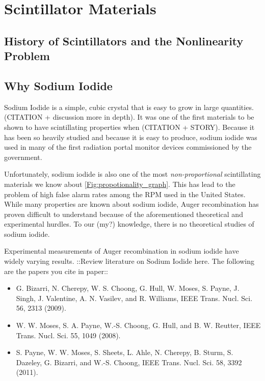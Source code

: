 \section{Scintillator Materials}\label{scintillator-materials}

\subsection{History of Scintillators and the Nonlinearity
Problem}\label{history-of-scintillators-and-the-nonlinearity-problem}

\subsection{Why Sodium Iodide}\label{why-sodium-iodide}

Sodium Iodide is a simple, cubic crystal that is easy to grow in large
quantities. (CITATION + discussion more in depth). It was one of the
first materials to be shown to have scintillating properties when
(CITATION + STORY). Because it has been so heavily studied and because
it is easy to produce, sodium iodide was used in many of the first
radiation portal monitor devices commissioned by the government.

Unfortunately, sodium iodide is also one of the most
\emph{non-proportional} scintillating materials we know about
\ref{Fig:propotionality_graph}. This has lead to the problem of high
false alarm rates among the RPM used in the United States. While many
properties are known about sodium iodide, Auger recombination has proven
difficult to understand because of the aforementioned theoretical and
experimental hurdles. To our (my?) knowledge, there is no theoretical
studies of sodium iodide.

Experimental measurements of Auger recombination in sodium iodide have
widely varying results. ::Review literature on Sodium Iodide here. The
following are the papers you cite in paper::

\begin{itemize}
\tightlist
\item
  G. Bizarri, N. Cherepy, W. S. Choong, G. Hull, W. Moses, S. Payne, J.
  Singh, J. Valentine, A. N. Vasilev, and R. Williams, IEEE Trans. Nucl.
  Sci. 56, 2313 (2009).
\item
  W. W. Moses, S. A. Payne, W.-S. Choong, G. Hull, and B. W. Reutter,
  IEEE Trans. Nucl. Sci. 55, 1049 (2008).
\item
  S. Payne, W. W. Moses, S. Sheets, L. Ahle, N. Cherepy, B. Sturm, S.
  Dazeley, G. Bizarri, and W.-S. Choong, IEEE Trans. Nucl. Sci. 58, 3392
  (2011).
\end{itemize}

